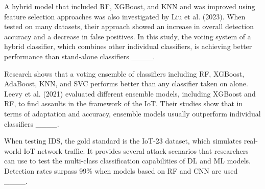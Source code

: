 
A hybrid model that included RF, XGBoost, and KNN and was improved using feature selection approaches was also investigated by Liu et al. (2023). When tested on many datasets, their approach showed an increase in overall detection accuracy and a decrease in false positives. In this study, the voting system of a hybrid classifier, which combines other individual classifiers, is achieving better performance than stand-alone classifiers ____.


Research shows that a voting ensemble of classifiers including RF, XGBoost, AdaBoost, KNN, and SVC performs better than any classifier taken on alone. Leevy et al. (2021) evaluated different ensemble models, including XGBoost and RF, to find assaults in the framework of the IoT. Their studies show that in terms of adaptation and accuracy, ensemble models usually outperform individual classifiers ____.


When testing IDS, the gold standard is the IoT-23 dataset, which simulates real-world IoT network traffic. It provides several attack scenarios that researchers can use to test the multi-class classification capabilities of DL and ML models. Detection rates surpass 99\% when models based on RF and CNN are used ____.

